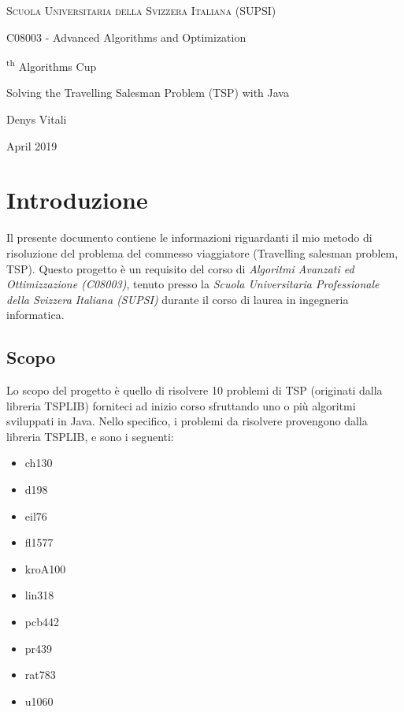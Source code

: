 \documentclass{article}
\newenvironment{itm}{
\begin{itemize}
  \setlength{\itemsep}{2pt}
  \setlength{\parskip}{2pt}
}{\end{itemize}}
\begin{document}
\begin{titlepage}
    \centering
    {\scshape Scuola Universitaria della Svizzera Italiana (SUPSI)\par}
    \vspace{0.5cm}
    {C08003 - Advanced Algorithms and Optimization\par}
    \vspace{5cm}
    {
        {\fontsize{1.5cm}{1.5cm}\textsuperscript{th} Algorithms Cup\par}
        \vspace{1cm}
        {\Large Solving the Travelling Salesman Problem (TSP) with Java \par}
    }
    \vspace{8cm}
    {\large Denys Vitali\par}
    \vspace{1cm}
    {\large April 2019}
    \vfill
\end{titlepage}

\pagebreak

\tableofcontents
\pagebreak
\section{Introduzione}
Il presente documento contiene le informazioni riguardanti il mio metodo di
risoluzione del problema del commesso viaggiatore (Travelling salesman problem, TSP).
Questo progetto è un requisito del corso di
\textit{Algoritmi Avanzati ed Ottimizzazione (C08003)}, tenuto presso la
\textit{Scuola Universitaria Professionale della Svizzera Italiana (SUPSI)} durante il
corso di laurea in ingegneria informatica.
\subsection{Scopo}
Lo scopo del progetto è quello di risolvere 10 problemi di TSP (originati dalla
libreria TSPLIB) forniteci ad inizio corso sfruttando uno o più algoritmi
sviluppati in Java.
Nello specifico, i problemi da risolvere provengono dalla libreria TSPLIB, e
sono i seguenti:
\begin{itm}
    \item ch130
    \item d198
    \item eil76
    \item fl1577
    \item kroA100
    \item lin318
    \item pcb442
    \item pr439
    \item rat783
    \item u1060
\end{itm}
\end{document}
